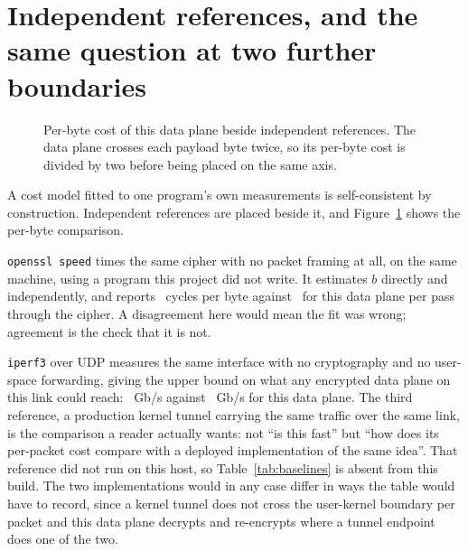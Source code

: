 \section{Independent references, and the same question at two further
boundaries}
\label{sec:baselines}

\begin{figure}[t]
\centering
{}
\caption{Per-byte cost of this data plane beside independent references. The
data plane crosses each payload byte twice, so its per-byte cost is divided by
two before being placed on the same axis.}
\label{fig:baselines}
\end{figure}

A cost model fitted to one program's own measurements is self-consistent by
construction. Independent references are placed beside it, and
Figure~\ref{fig:baselines} shows the per-byte comparison.

\texttt{openssl speed} times the same cipher with no packet framing at all, on
the same machine, using a program this project did not write. It estimates $b$
directly and independently, and reports \ cycles per byte
against \ for this data plane per pass through the cipher. A
disagreement here would mean the fit was wrong; agreement is the check that it
is not.

\texttt{iperf3} over UDP measures the same interface with no cryptography and no
user-space forwarding, giving the upper bound on what any encrypted data plane
on this link could reach: \ Gb/s against \ Gb/s for
this data plane. The third reference, a production kernel tunnel
\cite{wireguard} carrying the same traffic over the same link, is the comparison
a reader actually wants: not ``is this fast'' but ``how does its per-packet cost
compare with a deployed implementation of the same idea''. That reference did
not run on this host, so Table~\ref{tab:baselines} is absent from this build.
The two implementations would in any case differ in ways the table would have to
record, since a kernel tunnel does not cross the user-kernel boundary per packet
and this data plane decrypts and re-encrypts where a tunnel endpoint does one of
the two.

\begin{table}[t]
\caption{Independent references. The passes column is the number of times each
payload byte crosses a cipher, which is what makes the per-byte figures
comparable.}
\label{tab:baselines}
\centering\footnotesize

\end{table}

